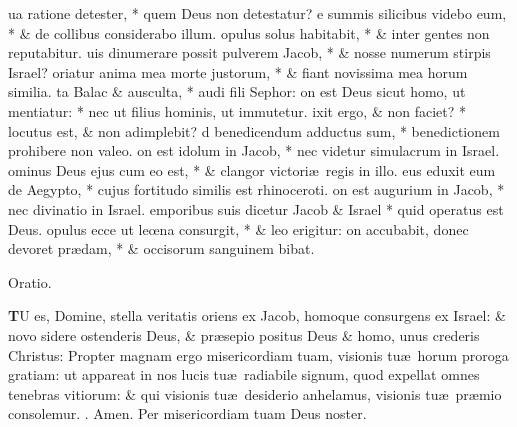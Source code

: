\documentclass[letter,11pt]{book}
\makeatletter
\DeclareRobustCommand{\Rbar}{\vers@resp{0pt}{R}}
\newcommand{\vers@resp@sym}{\raisebox{0.2ex}{\rotatebox[origin=c]{-20}{$\m@th\rceil$}}}
\newcommand{\vers@resp}[2]{%
  {\ooalign{\hidewidth\kern#1\vers@resp@sym\hidewidth\cr#2\cr}}%
}%
\def\R{\color{Red} \Rbar . \color{black}}
\makeatother
\begin{document}
\begin{multicols*}{2}
ua ratione detester, * quem Deus non detestatur?
e summis silicibus videbo eum, * \& de collibus considerabo illum.
opulus solus habitabit, * \& inter gentes non reputabitur.
uis dinumerare possit pulverem Jacob, * \& nosse numerum stirpis Israel?
oriatur anima mea morte justorum, * \&
fiant novissima mea horum similia.
ta Balac \& ausculta, * audi fili Sephor:
on est Deus sicut homo, ut mentiatur: * nec ut filius hominis, ut immutetur.
ixit ergo, \& non faciet? * locutus est, \& non adimplebit?
d benedicendum adductus sum, * benedictionem prohibere non valeo.
on est idolum in Jacob, * nec videtur simulacrum in Israel.
ominus Deus ejus cum eo est, * \& clangor victori\ae \ regis in illo.
eus eduxit eum de Aegypto, * cujus fortitudo similis est rhinoceroti.
on est augurium in Jacob, * nec divinatio in Israel.
emporibus suis dicetur Jacob \& Israel * quid operatus est Deus.
opulus ecce ut le\oe na consurgit, * \& leo erigitur:
on accubabit, donec devoret pr\ae dam, * \& occisorum sanguinem bibat.
\vspace{-.5em} \begin{center} \color{Red} Oratio. \color{black} \end{center} \vspace{-.5em}
\lettrine[lines=2]{\bfseries \color{Red} T}{}U es, Domine, stella veritatis oriens ex Jacob, homoque consurgens ex Israel: \& novo sidere ostenderis Deus, \& pr\ae sepio positus Deus \& homo, unus crederis Christus: Propter magnam ergo misericordiam tuam, visionis tu\ae \ horum proroga gratiam: ut appareat in nos lucis tu\ae \ radiabile signum, quod expellat omnes tenebras vitiorum: \& qui visionis tu\ae \ desiderio anhelamus, visionis tu\ae \ pr\ae mio consolemur. \R Amen. Per misericordiam tuam Deus noster.

\end{multicols*}
\end{document}
